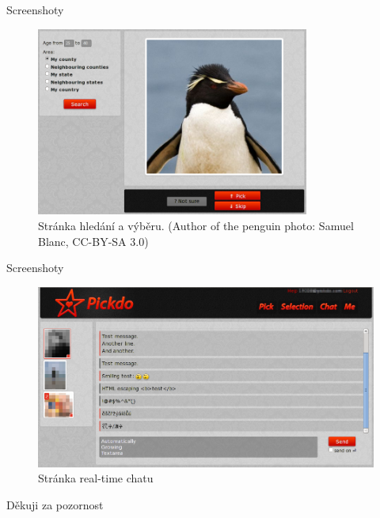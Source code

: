 \documentclass[xcolor=dvipsnames]{beamer}
\begin{document}
	\begin{frame}{Screenshoty}
		\begin{figure}[h]
	  \centering
	    \includegraphics[width=0.8\textwidth]{../tex/screen-search.png}
		  \caption{Stránka hledání a výběru. (Author of the penguin photo: Samuel Blanc, CC-BY-SA 3.0)}
		  \label{fig:screen-search}
	  \end{figure}
	\end{frame}

	\begin{frame}{Screenshoty}
			\begin{figure}[h]
	  \centering
	    \includegraphics[width=1.0\textwidth]{../tex/screen-chat.png}
		  \caption{Stránka real-time chatu}
		  \label{fig:screen-chat}
	  \end{figure}
	\end{frame}
	
	\begin{frame}
		\begin{center}
			Děkuji za pozornost
		\end{center}
	\end{frame}
\end{document}
